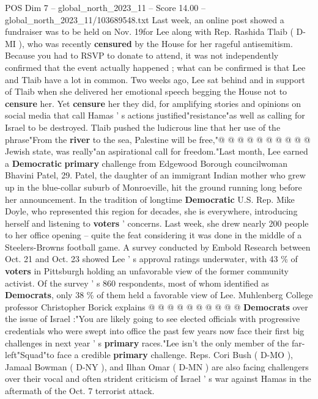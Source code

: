 \begin{textsample}{POS Dim 7 – global\_north\_2023\_11 – Score 14.00 – global\_north\_2023\_11/103689548.txt}
Last week, an online post showed a fundraiser was to be held on Nov. 19for Lee along with Rep.
Rashida Tlaib ( D-MI ), who was recently \textbf{censured} by the House for her rageful antisemitism.
Because you had to RSVP to donate to attend, it was not independently confirmed that the event actually happened ; what can be confirmed is that Lee and Tlaib have a lot in common.
Two weeks ago, Lee sat behind and in support of Tlaib when she delivered her emotional speech begging the House not to \textbf{censure} her.
Yet \textbf{censure} her they did, for amplifying stories and opinions on social media that call Hamas ' s actions justified"resistance"as well as calling for Israel to be destroyed.
Tlaib pushed the ludicrous line that her use of the phrase"From the \textbf{river} to the sea, Palestine will be free,"@ @ @ @ @ @ @ @ @ @ Jewish state, was really"an aspirational call for freedom."Last month, Lee earned a \textbf{Democratic} \textbf{primary} challenge from Edgewood Borough councilwoman Bhavini Patel, 29.
Patel, the daughter of an immigrant Indian mother who grew up in the blue-collar suburb of Monroeville, hit the ground running long before her announcement.
In the tradition of longtime \textbf{Democratic} U.S.
Rep.
Mike Doyle, who represented this region for decades, she is everywhere, introducing herself and listening to \textbf{voters} ' concerns.
Last week, she drew nearly 200 people to her office opening -- quite the feat considering it was done in the middle of a Steelers-Browns football game.
A survey conducted by Embold Research between Oct. 21 and Oct. 23 showed Lee ' s approval ratings underwater, with 43 \% of \textbf{voters} in Pittsburgh holding an unfavorable view of the former community activist.
Of the survey ' s 860 respondents, most of whom identified as \textbf{Democrats}, only 38 \% of them held a favorable view of Lee.
Muhlenberg College professor Christopher Borick explains @ @ @ @ @ @ @ @ @ @ \textbf{Democrats} over the issue of Israel :"You are likely going to see elected officials with progressive credentials who were swept into office the past few years now face their first big challenges in next year ' s \textbf{primary} races."Lee isn't the only member of the far-left"Squad"to face a credible \textbf{primary} challenge.
Reps.
Cori Bush ( D-MO ), Jamaal Bowman ( D-NY ), and Ilhan Omar ( D-MN ) are also facing challengers over their vocal and often strident criticism of Israel ' s war against Hamas in the aftermath of the Oct. 7 terrorist attack.

\end{textsample}

